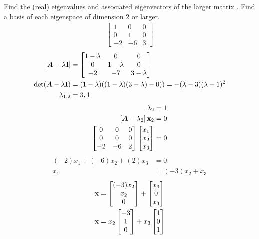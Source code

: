 \documentclass{article}
\begin{document}
Find the (real) eigenvalues and associated eigenvectors of the larger matrix . Find a basis of each eigenspace of dimension 2 or larger.
\begin{align*}
	\begin{bmatrix}
		1 & 0 & 0 \\
		0 & 1 & 0 \\
		-2 & -6 & 3
	\end{bmatrix}
\end{align*}
\begin{align*}
	\left| \matr{A} - \lambda \vect{I} \right| & =
		\begin{bmatrix}
			1 - \lambda & 0 & 0 \\
			0 & 1 - \lambda & 0 \\
			-2 & -7 & 3 - \lambda
		\end{bmatrix} \\
	\det( \matr{A} - \lambda \vect{I} ) & = (1 - \lambda)( (1 - \lambda)(3 - \lambda) - 0) ) = -(\lambda - 3)(\lambda - 1)^2 \\
	\lambda_{1,2} & = 3, 1
\end{align*}
\begin{align*}
	\lambda_2 & = 1 \\
	\left[ \matr{A} - \lambda_2 \right] \vect{x}_2 & = 0 \\
	\begin{bmatrix}
		0 & 0 & 0 \\
		0 & 0 & 0 \\
		-2 & -6 & 2
	\end{bmatrix}
	\begin{bmatrix} x_1 \\ x_2 \\ x_3 \end{bmatrix} & = 0
\end{align*}
\begin{align*}
	(-2)x_1 + (-6)x_2 + (2)x_3 & = 0 \\
	x_1 & = (-3)x_2 + x_3
\end{align*}
\begin{align*}
	\vect{x} & = \begin{bmatrix} (-3) x_2 \\ x_2 \\ 0 \end{bmatrix} + \begin{bmatrix} x_3 \\ 0 \\ x_3 \end{bmatrix} \\
	\vect{x} & = x_2 \begin{bmatrix} -3 \\ 1 \\ 0 \end{bmatrix} + x_3 \begin{bmatrix} 1 \\ 0 \\ 1 \end{bmatrix}
\end{align*}
\end{document}
